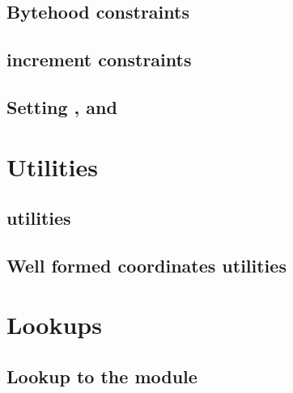 \subsection{Bytehood constraints}                                           \label{bls: bytehood and accumulator}                                
\subsection{\blsId{} increment constraints}                                 \label{bls: stamp increments}                                        

\subsection{Setting \malformedDataBit, \malformedDataAcc{} and \malformedDataExternalJustification}     \label{bls: malformed bit acc justification}                    

\section{Utilities}                                                                                                                             
\subsection{\wcpMod{} utilities}                                            \label{bls: wcp utilities}                                           
\subsection{Well formed coordinates utilities}                              \label{bls: well formed coordinates utilities}                       
     
\section{Lookups}     
\subsection{Lookup to the \wcpMod{} module}                                 \label{bls: lookups: wcp}                                            
     
